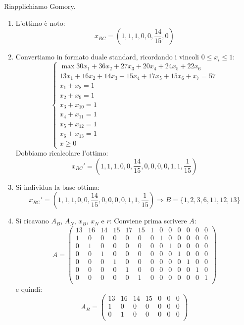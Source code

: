 \documentclass[a4paper,11pt]{article}
\begin{document}
Riapplichiamo Gomory.
\begin{enumerate}
	\item L'ottimo è noto:
$$
x_{RC} = \left( 1, 1, 1, 0, 0, \frac{14}{15}, 0 \right)
$$
	\item Convertiamo in formato duale standard, ricordando i vincoli $0 \leq x_i \leq 1$:
\[
	\begin{cases}	
		\max 30 x_1 + 36 x_2 + 27 x_3 + 20 x_4 + 24 x_5 + 22 x_6 \\ 
		13 x_1 + 16 x_2 + 14 x_3 + 15 x_4 +17 x_5 + 15 x_6 + x_7 = 57 \\ 
		x_1 + x_8 = 1 \\
		x_2 + x_9 = 1 \\
		
		x_3 + x_{10} = 1 \\
		x_4 + x_{11} = 1 \\
		x_5 + x_{12} = 1 \\
		x_6 + x_{13} = 1 \\
		x \geq 0
	\end{cases}
\]
Dobbiamo ricalcolare l'ottimo:
$$ 
x_{RC}' = \left( 1, 1, 1, 0, 0, \frac{14}{15}, 0, 0, 0, 0, 1, 1, \frac{1}{15} \right)
$$
\item Si individua la base ottima:
$$
x_{RC}' = \left( 1, 1, 1, 0, 0, \frac{14}{15}, 0, 0, 0, 0, 1, 1, \frac{1}{15} \right) \Rightarrow B = \{1, 2, 3, 6, 11, 12, 13\}
$$
\item Si ricavano $A_B$, $A_N$, $x_B$, $x_N$ e $r$:
	Conviene prima scrivere $A$:
	\setcounter{MaxMatrixCols}{200}
	$$
	A = 
	\begin{pmatrix}
		13 & 16 & 14 & 15 & 17 & 15 & 1 & 0 & 0 & 0 & 0 & 0 & 0 \\
		1 & 0 & 0 & 0 & 0 & 0 & 0 & 1 & 0 & 0 & 0 & 0 & 0 \\
		0 & 1 & 0 & 0 & 0 & 0 & 0 & 0 & 1 & 0 & 0 & 0 & 0 \\
		0 & 0 & 1 & 0 & 0 & 0 & 0 & 0 & 0 & 1 & 0 & 0 & 0 \\
		0 & 0 & 0 & 1 & 0 & 0 & 0 & 0 & 0 & 0 & 1 & 0 & 0 \\
		0 & 0 & 0 & 0 & 1 & 0 & 0 & 0 & 0 & 0 & 0 & 1 & 0 \\
		0 & 0 & 0 & 0 & 0 & 1 & 0 & 0 & 0 & 0 & 0 & 0 & 1 \\
	\end{pmatrix}
	$$
	e quindi:
	$$
	A_B = 
	\begin{pmatrix}
		13 & 16 & 14 & 15 & 0 & 0 & 0 \\
		1 & 0 & 0 & 0 & 0 & 0 & 0 \\
		0 & 1 & 0 & 0 & 0 & 0 & 0 \\

\end{pmatrix}$$
\end{enumerate}
\end{document}
